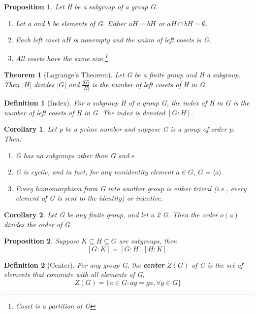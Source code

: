 \documentclass[12pt]{article}
\newtheorem{definition}{Definition}[subsection]
\newtheorem{theorem}{Theorem}[subsection]
\newtheorem{proposition}{Proposition}[subsection]
\newtheorem{corollary}{Corollary}[subsection]
\begin{document}
    \begin{proposition}
        Let H be a subgroup of a group G.
        \begin{enumerate}
            \item Let a and b be elements of G. Either $aH = bH$ or $aH \cap bH = \emptyset$.
            \item Each left coset aH is nonempty and the union of left cosets is G.
            \item All cosets have the same size.\footnote{Coset is a partition of G}

        \end{enumerate}
    \end{proposition}

    \begin{theorem}[Lagrange's Theorem]
        Let G be a finite group and H a subgroup. Then $|H|$ divides $|G|$ and $\frac{|G|}{|H|}$ is the number of left cosets of H in G.
    \end{theorem}

    \begin{definition}[Index]
        For a subgroup H of a group G, the index of H in G is the number of left cosets of H in G. The index is denoted $[G:H]$.
    \end{definition}

    \begin{corollary}
        Let p be a prime number and suppose G is a group of order p. Then:
        \begin{enumerate}
            \item G has no subgroups other than G and ${e}$.
            \item G is cyclic, and in fact, for any nonidentity element $a \in G$, $G = \langle a \rangle$.
            \item Every homomorphism from G into another group is either trivial
(i.e., every element of G is sent to the identity) or injective.
        \end{enumerate}

    \end{corollary}

    \begin{corollary}
        Let G be any finite group, and let a 2 G. Then the order $o(a)$ divides the order of G.
    \end{corollary}

    \begin{proposition}
        Suppose $K \subseteq H \subseteq G$ are subgroups, then \[[G:K] = [G:H][H:K].\]
    \end{proposition}
    \begin{definition}[Center]
        For any group G, the \textbf{center} $Z(G)$ of G is the set of elements that commute with all elements of G,
        \[Z(G)=\{a\in G: ag=ga,  \forall g \in G\}\]
    \end{definition}
\end{document}
